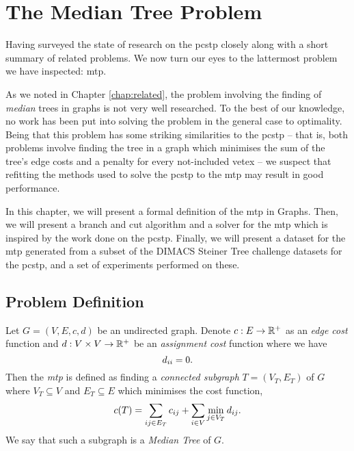 \chapter{The Median Tree Problem}
\label{chap:mediantree}
Having surveyed the state of research on the \gls{pcstp} closely along with a
short summary of related problems. We now turn our eyes to the lattermost problem we have inspected:
\gls{mtp}.

As we noted in Chapter \ref{chap:related}, the problem involving the finding of \textit{median} trees
in graphs is not very well researched. To the best of our knowledge, no work has been put into solving
the problem in the general case to optimality. Being that this problem has some striking similarities
to the \gls{pcstp} -- that is, both problems involve finding the tree in a graph which minimises the sum
of the tree's edge costs and a penalty for every not-included vetex -- we suspect that refitting the
methods used to solve the \gls{pcstp} to the \gls{mtp} may result in good performance.

In this chapter, we will present a formal definition of the \acrlong{mtp} in Graphs. Then,
we will present a branch and cut algorithm and a solver for the \gls{mtp} which is inspired by the
work done on the \gls{pcstp}. Finally, we will present a dataset for the \gls{mtp} generated from a subset
of the DIMACS Steiner Tree challenge datasets for the \gls{pcstp}\citep{DIMACS},
and a set of experiments performed
on these.
 
\section{Problem Definition}

Let $G = (V, E, c, d)$ be an undirected graph. Denote $c : E \to \mathbb{R}^+$ as an \textit{edge cost} function
and $d : V \times V  \to \mathbb{R}^+$ be an \textit{assignment cost} function where we have
$$d_{ii} = 0 \mathnormal{.}$$
Then the \textit{\acrlong{mtp}}
is defined as finding a \textit{connected subgraph} $T = (V_T, E_T)$ of $G$
where $V_T \subseteq V$ and
$E_T \subseteq E$ which minimises the cost function,
$$c(T) = \sum_{ij \in E_T} c_{ij} + \sum_{i \in V} \min_{j \in V_T} d_{ij}\mathnormal{.}$$
We say that such a subgraph is a \textit{Median Tree} of $G$.

